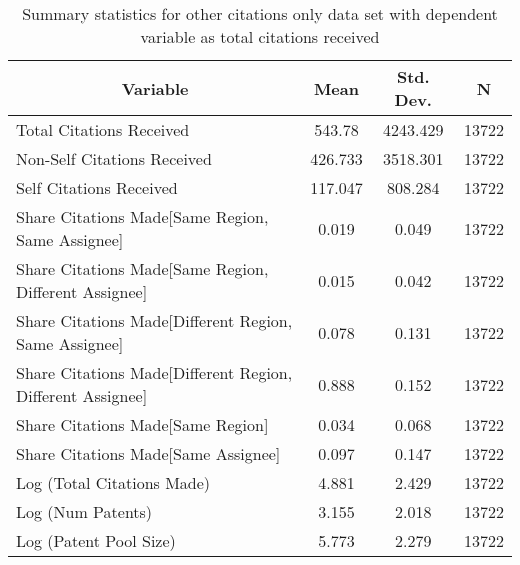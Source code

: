 
\begin{table}[htbp]\centering \caption{Summary statistics for other citations only data set with dependent variable as total citations received  \label{o.tsummary}}
\begin{tabular}{l c c  c}\hline\hline
\multicolumn{1}{c}{\textbf{Variable}} & \textbf{Mean}
 & \textbf{Std. Dev.} & \textbf{N}\\ \hline
Total Citations Received & 543.78 & 4243.429  & 13722\\
Non-Self Citations Received & 426.733 & 3518.301  & 13722\\
Self Citations Received & 117.047 & 808.284  & 13722\\
Share Citations Made[Same Region, Same Assignee] & 0.019 & 0.049  & 13722\\
Share Citations Made[Same Region, Different Assignee] & 0.015 & 0.042  & 13722\\
Share Citations Made[Different Region, Same Assignee] & 0.078 & 0.131  & 13722\\
Share Citations Made[Different Region, Different Assignee] & 0.888 & 0.152  & 13722\\
Share Citations Made[Same Region] & 0.034 & 0.068  & 13722\\
Share Citations Made[Same Assignee] & 0.097 & 0.147  & 13722\\
Log (Total Citations Made) & 4.881 & 2.429  & 13722\\
Log (Num Patents) & 3.155 & 2.018  & 13722\\
Log (Patent Pool Size) & 5.773 & 2.279  & 13722\\
\hline\end{tabular}
\end{table}
